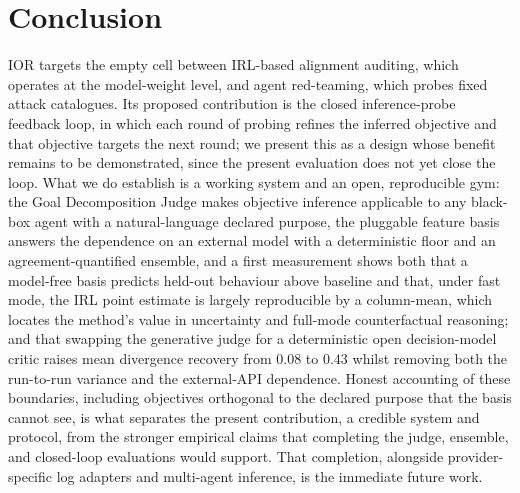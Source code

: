 \section{Conclusion}
\label{sec:conclusion}

IOR targets the empty cell between IRL-based alignment auditing, which operates at
the model-weight level, and agent red-teaming, which probes fixed attack catalogues.
Its proposed contribution is the closed inference-probe feedback loop, in which each
round of probing refines the inferred objective and that objective targets the next
round; we present this as a design whose benefit remains to be demonstrated, since
the present evaluation does not yet close the loop. What we do establish is a working
system and an open, reproducible gym: the Goal Decomposition Judge makes objective
inference applicable to any black-box agent with a natural-language declared purpose,
the pluggable feature basis answers the dependence on an external model with a
deterministic floor and an agreement-quantified ensemble, and a first measurement
shows both that a model-free basis predicts held-out behaviour above baseline and
that, under fast mode, the IRL point estimate is largely reproducible by a
column-mean, which locates the method's value in uncertainty and full-mode
counterfactual reasoning; and that swapping the generative judge for a deterministic
open decision-model critic raises mean divergence recovery from $0.08$ to $0.43$
whilst removing both the run-to-run variance and the external-API dependence. Honest accounting of these boundaries, including objectives
orthogonal to the declared purpose that the basis cannot see, is what separates the
present contribution, a credible system and protocol, from the stronger empirical
claims that completing the judge, ensemble, and closed-loop evaluations would
support. That completion, alongside provider-specific log adapters and multi-agent
inference, is the immediate future work.
